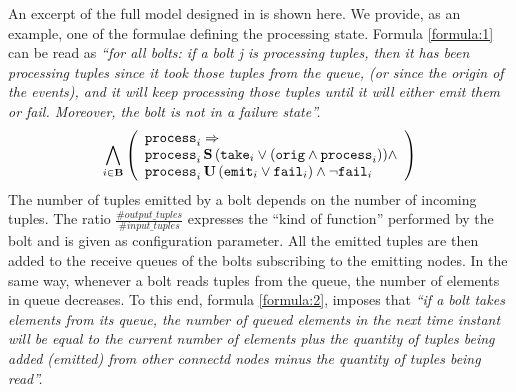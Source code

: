 %	
%	
%	
%	
An excerpt of the full model designed in \cite{MBER16} is shown here.
We provide, as an example, one of the formulae defining the processing state. Formula \ref{formula:1} can be read as \textit{``for all bolts: if a bolt j is processing tuples, then it has been processing tuples since it took those tuples from the queue, (or since the origin of the events), and it will keep processing those tuples until it will either emit them or fail. Moreover, the bolt is not in a failure state''.}
\begin{align}
\small
%
\bigwedge_{
	i \in \mathbf{B} } 
\left( 
\begin{array}{l}
\p{i} \Rightarrow \\
\p{i} \, \Snc \, ( \ta{i} \lor (\ori \land \p{i})) \land \\
\p{i} \, \U \, (\e{i} \lor \f{i}) \land \lnot \f{i} 
\end{array}
\right) \label{formula:1} 
%
\end{align}
The number of tuples emitted by a bolt depends on the number of incoming tuples. The ratio $\frac{\#output\_tuples}{\#input\_tuples}$ %
expresses the ``kind of function''  performed by the bolt and is given as configuration parameter. 
All the emitted tuples are then added to the receive queues of the bolts subscribing to the emitting nodes.
In the same way, whenever a bolt reads tuples from the queue, the number of elements in queue decreases. To this end, formula \ref{formula:2}, imposes that \textit{``if a bolt takes elements from its queue, the number of queued elements in the next time instant will be equal to the current number of elements plus the quantity of tuples being added (emitted) from other connectd nodes minus the quantity of tuples being read''.}
